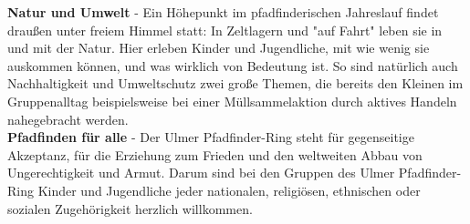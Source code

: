 \textbf{Natur und Umwelt} - Ein Höhepunkt im pfadfinderischen Jahreslauf findet draußen unter 
freiem Himmel statt: In Zeltlagern und "auf Fahrt" leben sie in und mit der Natur. Hier erleben 
Kinder und Jugendliche, mit wie wenig sie auskommen können, und was wirklich von Bedeutung ist. So 
sind natürlich auch Nachhaltigkeit und Umweltschutz zwei große Themen, die bereits den Kleinen im 
Gruppenalltag beispielsweise bei einer Müllsammelaktion durch aktives Handeln nahegebracht werden. 
\\

\textbf{Pfadfinden für alle} - Der Ulmer Pfadfinder-Ring steht für gegenseitige Akzeptanz, für die 
Erziehung zum Frieden und den weltweiten Abbau von Ungerechtigkeit und Armut. Darum sind bei den 
Gruppen des Ulmer Pfadfinder-Ring Kinder und Jugendliche jeder nationalen, religiösen, ethnischen 
oder sozialen Zugehörigkeit herzlich willkommen.
